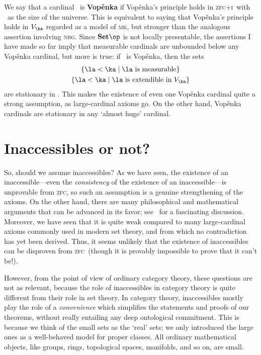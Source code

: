\documentclass{amsart}
\newcommand{\Set}{\ensuremath{\mathbf{Set}}}
\def\zfc{\textsc{zfc}}
\def\zfci{\textsc{zfc+i}}
\def\nbg{\textsc{nbg}}
\def\mk{\textsc{mk}}
\begin{document}
We say that a cardinal \ka\ is \textbf{Vop\v{e}nka} if {Vop\v{e}nka's
  principle} holds in \zfci\ with \ka\ as the size of the universe.
This is equivalent to saying that {Vop\v{e}nka's principle} holds in
$V_\ka$ regarded as a model of \mk, but stronger than the analogous
assertion involving \nbg.  Since $\Set\op$ is not locally presentable,
the assertions I have made so far imply that measurable cardinals are
unbounded below any Vop\v{e}nka cardinal, but more is true: if \ka\ is
Vop\v{e}nka, then the sets
\begin{gather*}
  \{\la<\ka \mid \la \text{ is measurable}\}\\
  \{\la<\ka \mid \la \text{ is extendible in } V_\ka\}
\end{gather*}
are stationary in \ka.  This makes the existence of even one
Vop\v{e}nka cardinal quite a strong assumption, as large-cardinal
axioms go.  On the other hand, Vop\v{e}nka cardinals are stationary in
any `almost huge' cardinal.


\section{Inaccessibles or not?}
\label{sec:phil-inacc}

So, should we assume inaccessibles?  As we have seen, the existence of
an inaccessible---even the \emph{consistency} of the existence of an
inaccessible---is unprovable from \zfc, so such an assumption is a
genuine strengthening of the axioms.  On the other hand, there are
many philosophical and mathematical arguments that can be advanced in
its favor; see~\cite{believing-axioms-i} for a fascinating discussion.
Moreover, we have seen that it is quite weak compared to many
large-cardinal axioms commonly used in modern set theory, and from
which no contradiction has yet been derived.  Thus, it seems unlikely
that the existence of inaccessibles can be disproven from \zfc\
(though it is provably impossible to prove that it can't be!).

However, from the point of view of ordinary category theory, these
questions are not as relevant, because the role of inaccessibles in
category theory is quite different from their role in set theory.  In
category theory, inaccessibles mostly play the role of a
\emph{convenience} which simplifies the statements and proofs of our
theorems, without really entailing any deep ontological commitment.
This is because we think of the small sets as the `real' sets; we only
introduced the large ones as a well-behaved model for proper classes.
All ordinary mathematical objects, like groups, rings, topological
spaces, manifolds, and so on, are small.
\end{document}
